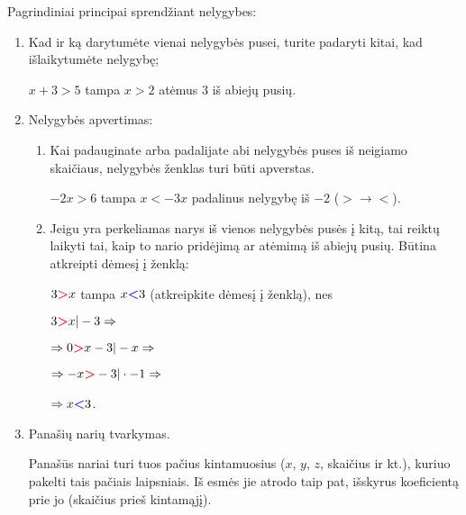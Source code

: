 \documentclass[a4paper]{article}
\begin{document}
Pagrindiniai principai sprendžiant nelygybes:

\begin{enumerate}
      \item Kad ir ką darytumėte vienai nelygybės pusei, turite padaryti kitai,
            kad išlaikytumėte nelygybę;

            $x+3>5$ tampa $x>2$ atėmus 3 iš abiejų pusių.

      \item Nelygybės apvertimas:

            \begin{enumerate}[label*=\arabic*.]

                  \item Kai padauginate arba padalijate abi nelygybės puses iš
                        neigiamo skaičiaus, nelygybės ženklas turi būti
                        apverstas.

                        $-2x>6$ tampa $x<-3x$ padalinus nelygybę iš $-2$
                        ($\boldsymbol{>} \rightarrow \boldsymbol{<}$).

                  \item Jeigu yra perkeliamas narys iš vienos nelygybės pusės į
                        kitą, tai reiktų laikyti tai, kaip to nario pridėjimą
                        ar
                        atėmimą iš abiejų
                        pusių. Būtina atkreipti dėmesį į ženklą:

                        $3\boldsymbol{\textcolor{red}{>}}x$ tampa
                        $x\boldsymbol{\textcolor{blue}{<}}3$ (atkreipkite
                        dėmesį į
                        ženklą), nes

                        $3\boldsymbol{\textcolor{red}{>}}x |-3 \Rightarrow$

                        $\Rightarrow 0\boldsymbol{\textcolor{red}{>}}x-3|-x
                              \Rightarrow$

                        $\Rightarrow
                              -x\boldsymbol{\textcolor{red}{>}}-3|\cdot-1
                              \Rightarrow$

                        $\Rightarrow x\boldsymbol{\textcolor{blue}{<}}3$.

            \end{enumerate}

      \item Panašių narių tvarkymas.

            Panašūs nariai turi tuos pačius kintamuosius ($x$, $y$, $z$,
            skaičius
            ir kt.), kuriuo pakelti tais pačiais laipsniais.
            Iš esmės jie atrodo taip pat, išskyrus koeficientą prie jo
            (skaičius
            prieš kintamąjį).


\end{enumerate}
\end{document}
